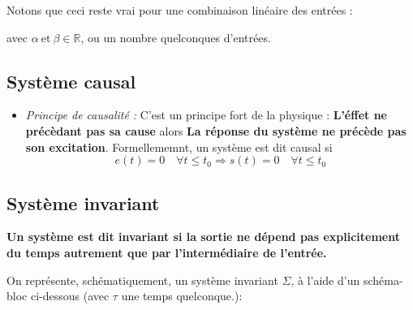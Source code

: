 \begin{itemize}
    Notons que ceci reste vrai pour une combinaison linéaire des entrées :
    \begin{center}
    \end{center}
    avec $\alpha\ \text{et}\ \beta\in\mathbb{R}$, ou un nombre quelconques d'entrées.
\end{itemize}

\subsection{Système causal}
\begin{itemize}
    \item \emph{Principe de causalité :}
        C'est un principe fort de la physique :
        \textbf{\og L'éffet ne précèdant pas sa cause\fg} alors 
        \textbf{\og La réponse du système ne précède pas son excitation\fg}.
        Formellememnt, un système est dit causal si 
        $$e(t)=0\quad\forall t\le t_0 \Rightarrow s(t)=0\quad\forall t\le t_0 $$  
\end{itemize}

\subsection{Système invariant}
\textbf{Un système est dit invariant si la sortie ne dépend pas 
explicitement du temps autrement que par l'intermédiaire de l'entrée.}

On représente, schématiquement, un système invariant $\Sigma$, à l'aide d'un schéma-bloc ci-dessous 
(avec $\tau$ une temps quelconque.): 
\begin{center}
\end{center}

